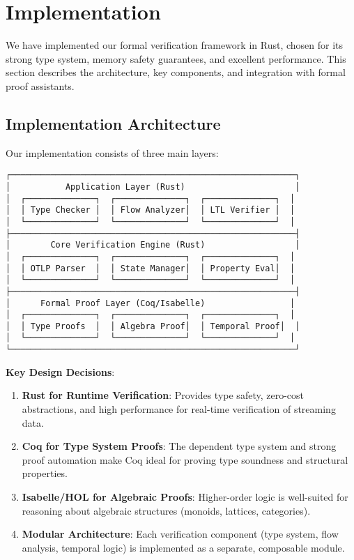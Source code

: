 
\section{Implementation}
\label{sec:implementation}

We have implemented our formal verification framework in Rust, chosen for its strong type system, memory safety guarantees, and excellent performance. This section describes the architecture, key components, and integration with formal proof assistants.

\subsection{Implementation Architecture}
\label{sec:impl-arch}

Our implementation consists of three main layers:

\begin{small}
\begin{verbatim}
┌─────────────────────────────────────────────────────────┐
│           Application Layer (Rust)                      │
│  ┌──────────────┐  ┌──────────────┐  ┌──────────────┐  │
│  │ Type Checker │  │ Flow Analyzer│  │ LTL Verifier │  │
│  └──────────────┘  └──────────────┘  └──────────────┘  │
├─────────────────────────────────────────────────────────┤
│        Core Verification Engine (Rust)                  │
│  ┌──────────────┐  ┌──────────────┐  ┌──────────────┐  │
│  │ OTLP Parser  │  │ State Manager│  │ Property Eval│  │
│  └──────────────┘  └──────────────┘  └──────────────┘  │
├─────────────────────────────────────────────────────────┤
│      Formal Proof Layer (Coq/Isabelle)                 │
│  ┌──────────────┐  ┌──────────────┐  ┌──────────────┐  │
│  │ Type Proofs  │  │ Algebra Proof│  │ Temporal Proof│  │
│  └──────────────┘  └──────────────┘  └──────────────┘  │
└─────────────────────────────────────────────────────────┘
\end{verbatim}
\end{small}

\textbf{Key Design Decisions}:
\begin{enumerate}
\item \textbf{Rust for Runtime Verification}: Provides type safety, zero-cost abstractions, and high performance for real-time verification of streaming \otlp data.

\item \textbf{Coq for Type System Proofs}: The dependent type system and strong proof automation make Coq ideal for proving type soundness and structural properties.

\item \textbf{Isabelle/HOL for Algebraic Proofs}: Higher-order logic is well-suited for reasoning about algebraic structures (monoids, lattices, categories).

\item \textbf{Modular Architecture}: Each verification component (type system, flow analysis, temporal logic) is implemented as a separate, composable module.
\end{enumerate}

